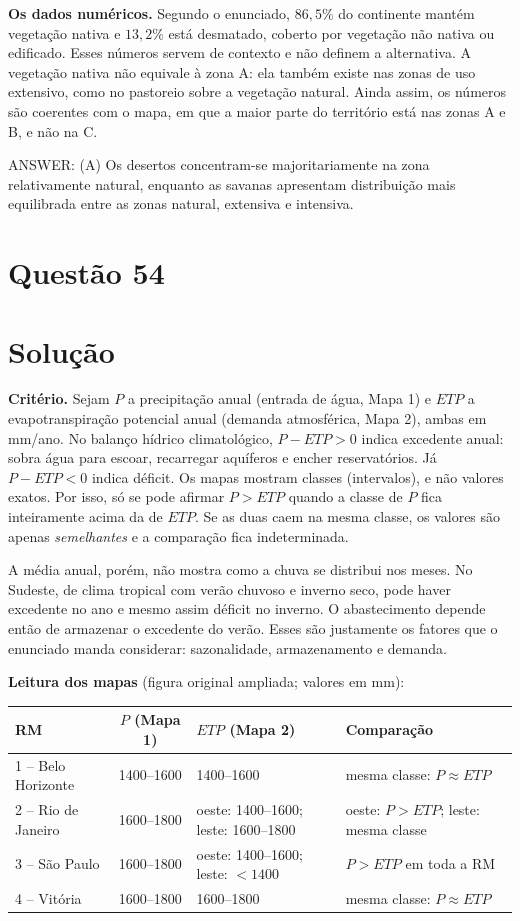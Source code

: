 \documentclass{article}%
\begin{document}
\textbf{Os dados numéricos.} Segundo o enunciado, $86{,}5\%$ do continente mantém vegetação nativa e $13{,}2\%$ está desmatado, coberto por vegetação não nativa ou edificado. Esses números servem de contexto e não definem a alternativa. A vegetação nativa não equivale à zona A: ela também existe nas zonas de uso extensivo, como no pastoreio sobre a vegetação natural. Ainda assim, os números são coerentes com o mapa, em que a maior parte do território está nas zonas A e B, e não na C.

ANSWER: (A) Os desertos concentram-se majoritariamente na zona relativamente natural, enquanto as savanas apresentam distribuição mais equilibrada entre as zonas natural, extensiva e intensiva.%
\newpage%
\section*{Questão 54}

\section*{Solução}

\textbf{Critério.} Sejam $P$ a precipitação anual (entrada de água, Mapa 1) e $ETP$ a evapotranspiração potencial anual (demanda atmosférica, Mapa 2), ambas em mm/ano. No balanço hídrico climatológico, $P - ETP > 0$ indica excedente anual: sobra água para escoar, recarregar aquíferos e encher reservatórios. Já $P - ETP < 0$ indica déficit. Os mapas mostram classes (intervalos), e não valores exatos. Por isso, só se pode afirmar $P > ETP$ quando a classe de $P$ fica inteiramente acima da de $ETP$. Se as duas caem na mesma classe, os valores são apenas \emph{semelhantes} e a comparação fica indeterminada.

A média anual, porém, não mostra como a chuva se distribui nos meses. No Sudeste, de clima tropical com verão chuvoso e inverno seco, pode haver excedente no ano e mesmo assim déficit no inverno. O abastecimento depende então de armazenar o excedente do verão. Esses são justamente os fatores que o enunciado manda considerar: sazonalidade, armazenamento e demanda.

\textbf{Leitura dos mapas} (figura original ampliada; valores em mm):
\begin{center}
\small
\begin{tabular}{|l|c|p{2.9cm}|p{3.1cm}|}
\hline
RM & $P$ (Mapa 1) & $ETP$ (Mapa 2) & Comparação \\ \hline
1 -- Belo Horizonte & 1400--1600 & 1400--1600 & mesma classe: $P \approx ETP$ \\ \hline
2 -- Rio de Janeiro & 1600--1800 & oeste: 1400--1600; leste: 1600--1800 & oeste: $P > ETP$; leste: mesma classe \\ \hline
3 -- São Paulo & 1600--1800 & oeste: 1400--1600; leste: $< 1400$ & $P > ETP$ em toda a RM \\ \hline
4 -- Vitória & 1600--1800 & 1600--1800 & mesma classe: $P \approx ETP$ \\ \hline
\end{tabular}
\end{center}
\end{document}
